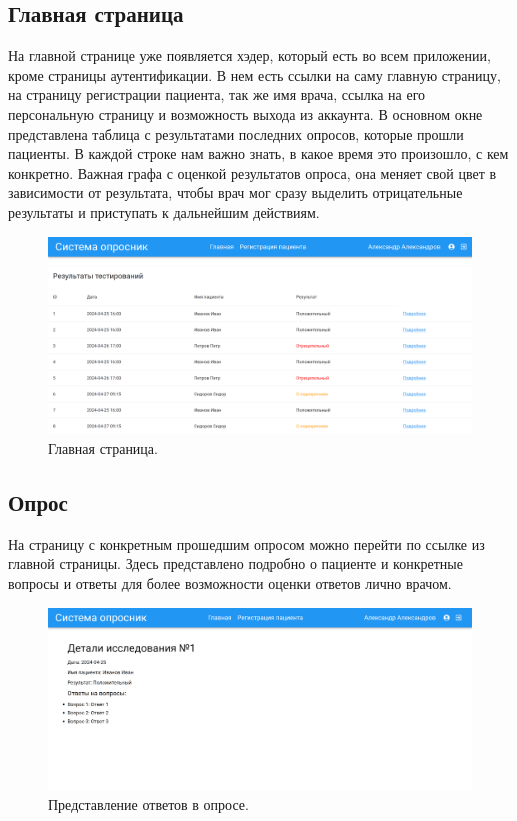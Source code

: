 \documentclass[a4paper,12pt]{article}
\begin{document}
    \subsection{Главная страница}\label{subsec:-2}
    На главной странице уже появляется хэдер, который есть во всем приложении, кроме страницы аутентификации.
    В нем есть ссылки на саму главную страницу, на страницу регистрации пациента, так же имя врача, ссылка на его персональную страницу и возможность выхода из аккаунта.
    В основном окне представлена таблица с результатами последних опросов, которые прошли пациенты.
    В каждой строке нам важно знать, в какое время это произошло, с кем конкретно.
    Важная графа с оценкой результатов опроса, она меняет свой цвет в зависимости от результата, чтобы врач мог сразу выделить отрицательные результаты и приступать к дальнейшим действиям.
    \begin{figure}[ht]
        \includegraphics[scale=0.17]{images/screenshots/main_page}
        \caption{Главная страница.}\label{fig:figure5}
    \end{figure}

    \subsection{Опрос}\label{subsec:2}
    На страницу с конкретным прошедшим опросом можно перейти по ссылке из главной страницы.
    Здесь представлено подробно о пациенте и конкретные вопросы и ответы для более возможности оценки ответов лично врачом.
    \begin{figure}[ht]
        \includegraphics[scale=0.17]{images/screenshots/inquirer}
        \caption{Представление ответов в опросе.}\label{fig:figure6}
    \end{figure}
\end{document}
